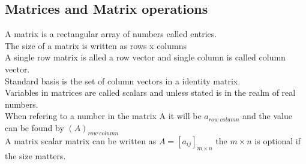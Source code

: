\documentclass[12pt, a4paper]{article}
\begin{document}
		\subsection{Matrices and Matrix operations}
			A matrix is a rectangular array of numbers called entries.\\
			The size of a matrix is written as rows x columns\\
			A single row matrix is alled a row vector and single column is called column vector.\\
			Standard basis  is the set of column vectors in a identity matrix.\\
			Variables in matrices are called scalars and unless stated is in the realm of real numbers.\\
			When refering to a number in the matrix A it will be $a_{row\;column}$ and the value can be found by $(A)_{row\;column}$\\
			A matrix scalar matrix can be written as $A=[a_{ij}]_{m\times n}$ the $m\times n$ is optional if the size matters.\\
\end{document}
